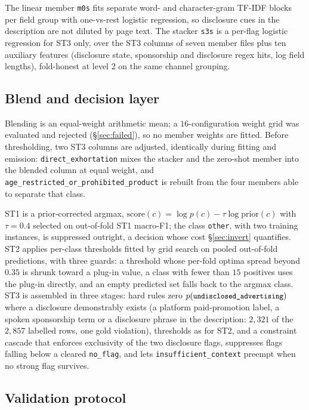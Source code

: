 \documentclass[11pt]{article}
\newcommand{\lab}[1]{\texttt{\small #1}}
\begin{document}
The linear member \lab{m0s} fits separate word- and character-gram TF-IDF blocks per field
group with one-vs-rest logistic regression, so disclosure cues in the description are not
diluted by page text. The stacker \lab{s3s} \cite{wolpert1992stacked} is a per-flag logistic
regression for ST3 only, over the ST3 columns of seven member files plus ten auxiliary features
(disclosure state, sponsorship and disclosure regex hits, log field lengths), fold-honest at
level 2 on the same channel grouping.

\subsection{Blend and decision layer}
\label{sec:decision}

Blending is an equal-weight arithmetic mean; a $16$-configuration weight grid was evaluated and
rejected (\S\ref{sec:failed}), so no member weights are fitted. Before thresholding, two ST3
columns are adjusted, identically during fitting and emission: \lab{direct\_exhortation} mixes
the stacker and the zero-shot member into the blended column at equal weight, and
\lab{age\_restricted\_or\_prohibited\_product} is rebuilt from the four members able to
separate that class.

ST1 is a prior-corrected argmax, $\mathrm{score}(c) = \log p(c) - \tau \log \mathrm{prior}(c)$
with $\tau{=}0.4$ selected on out-of-fold ST1 macro-F1; the class \lab{other}, with two training
instances, is suppressed outright, a decision whose cost \S\ref{sec:invert} quantifies. ST2
applies per-class thresholds fitted by grid search on pooled out-of-fold predictions, with three
guards: a threshold whose per-fold optima spread beyond $0.35$ is shrunk toward a plug-in value,
a class with fewer than $15$ positives uses the plug-in directly, and an empty predicted set
falls back to the argmax class. ST3 is assembled in three stages: hard rules zero
$p(\lab{undisclosed\_advertising})$ where a disclosure demonstrably exists (a platform
paid-promotion label, a spoken sponsorship term or a disclosure phrase in the description:
$2{,}321$ of the $2{,}857$ labelled rows, one gold violation), thresholds as for ST2, and a
constraint cascade that enforces exclusivity of the two disclosure flags, suppresses flags
falling below a cleared \lab{no\_flag}, and lets \lab{insufficient\_context} preempt when no
strong flag survives.

\subsection{Validation protocol}
\label{sec:protocol}
\end{document}
